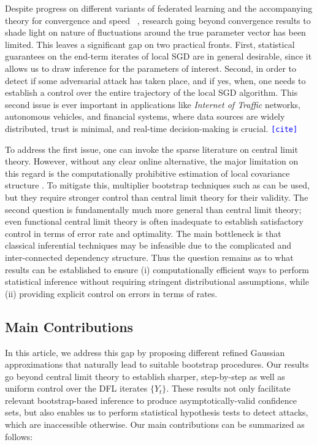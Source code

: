 \documentclass[a4paper,11pt]{article}
\newcommand{\nb}[1]{\textcolor{blue}{\texttt{[#1]}}}
\numberwithin{equation}{section}
\theoremstyle{plain}
\theoremstyle{remark}
\begin{document}
Despite progress on different variants of federated learning and the accompanying theory for convergence and speed ~\cite{haddadpour2019convergence, woodworth2020minibatch, koloskova2020unified}, research going beyond convergence results to shade light on nature of fluctuations around the true parameter vector has been limited. This leaves a significant gap on two practical fronts. First, statistical guarantees on the end-term iterates of local SGD are in general desirable, since it allows us to draw inference for the parameters of interest. Second, in order to detect if some adversarial attack has taken place, and if yes, when, one needs to establish a control over the entire trajectory of the local SGD algorithm. This second issue is ever important in applications like \textit{Internet of Traffic} networks, autonomous vehicles, and financial systems, where data sources are widely distributed, trust is minimal, and real-time decision-making is crucial. \nb{cite}


To address the first issue, one can invoke the sparse literature \cite{li2022statistical, songxichen2024} on central limit theory. However, without any clear online alternative, the major limitation on this regard is the computationally prohibitive estimation of local covariance structure . To mitigate this, multiplier bootstrap techniques such as \cite{fang2018jmlr, fang2019sjs} can be used, but they require stronger control than central limit theory for their validity. The second question is fundamentally much more general than central limit theory; even functional central limit theory is often inadequate to establish satisfactory control in terms of error rate and optimality. The main bottleneck is that classical inferential techniques may be infeasible due to the complicated and inter-connected dependency structure. Thus the question remains as to what results can be established to ensure (i) computationally efficient ways to perform statistical inference without requiring stringent distributional assumptions, while (ii) providing explicit control on errors in terms of rates.
\fi 
\subsection{Main Contributions} \label{se:main-contribution}
In this article, we address this gap by proposing different refined Gaussian approximations that naturally lead to suitable bootstrap procedures. Our results go beyond central limit theory to establish sharper, step-by-step as well as uniform control over the DFL iterates $\{Y_t\}$. These results not only facilitate relevant bootstrap-based inference to produce asymptotically-valid confidence sets, but also enables us to perform statistical hypothesis tests to detect attacks, which are inaccessible otherwise. Our main contributions can be summarized as follows:
\end{document}
